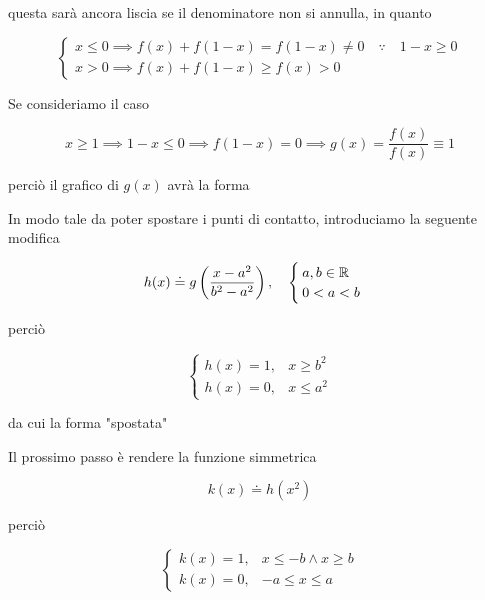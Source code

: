 questa sarà ancora liscia se il denominatore non si annulla, in quanto

\begin{equation}
	\begin{cases}
		x \leqslant 0 \implies f(x) + f(1-x) = f(1-x) \neq 0 \quad \because \quad 1-x \geqslant 0 \\
		x > 0 \implies f(x) + f(1-x) \geqslant f(x) > 0
	\end{cases}
\end{equation}

Se consideriamo il caso

\begin{equation}
	x \geqslant 1 %
	\implies %
	1-x \leqslant 0 %
	\implies %
	f(1-x) = 0 %
	\implies %
	g(x) = \dfrac{f(x)}{f(x)} \equiv 1
\end{equation}

perciò il grafico di $ g(x) $ avrà la forma


In modo tale da poter spostare i punti di contatto, introduciamo la seguente modifica

\begin{equation}
	h(x) \doteq g \left( \dfrac{x - a^{2}}{b^{2} - a^{2}} \right) %
	\qcomma %
	\begin{cases}
		a,b \in \R \\
		0 < a < b
	\end{cases}
\end{equation}

perciò

\begin{equation}
	\begin{cases}
		h(x) = 1, & x \geqslant b^{2} \\
		h(x) = 0, & x \leqslant a^{2}
	\end{cases}
\end{equation}

da cui la forma "spostata"


Il prossimo passo è rendere la funzione simmetrica

\begin{equation}
	k(x) \doteq h(x^{2})
\end{equation}

perciò

\begin{equation}
	\begin{cases}
		k(x) = 1, & x \leqslant - b \wedge x \geqslant b \\
		k(x) = 0, & -a \leqslant x \leqslant a
	\end{cases}
\end{equation}

